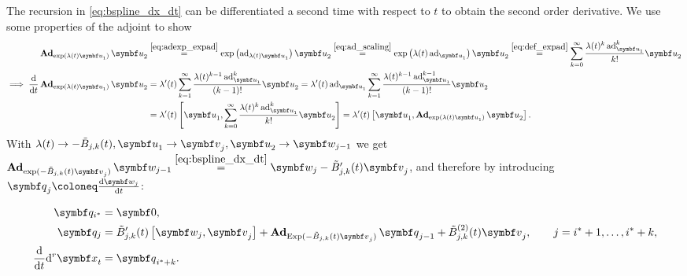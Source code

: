 The recursion in \eqref{eq:bspline_dx_dt} can be differentiated a second time with respect to $t$ to obtain the second order derivative. We use some properties of the adjoint to show
\begin{equation}
  \begin{aligned}
    \bAd_{\exp(\lambda(t) \bu_1)} \bu_2
     & \overset{\eqref{eq:adexp_expad}}= \exp \left( \ad_{\lambda(t) \bu_1} \right) \bu_2 \overset{\eqref{eq:ad_scaling}}= \exp \left( \lambda(t) \ad_{\bu_1} \right) \bu_2 \overset{\eqref{eq:def_expad}}= \sum_{k=0}^\infty \frac{\lambda(t)^k \ad_{\bu_1}^k  }{k!} \bu_2 \\
    \implies \frac{\mathrm{d}}{\mathrm{d}t} \bAd_{\exp(\lambda(t) \bu_1)} \bu_2
     & = \lambda'(t) \sum_{k=1}^\infty \frac{\lambda(t)^{k-1} \ad_{\bu_1}^k }{(k-1)!} \bu_2 = \lambda'(t) \ad_{\bu_1} \sum_{k=1}^\infty \frac{\lambda(t)^{k-1} \ad_{\bu_1}^{k-1} }{(k-1)!}\bu_2                                                                               \\
     & = \lambda'(t) \left[ \bu_1, \sum_{k=0}^\infty \frac{\lambda(t)^k \ad_{\bu_1}^k}{k!} \bu_2 \right]                                                                                   =  \lambda'(t) \left[ \bu_1, \bAd_{\exp(\lambda(t) \bu_1)} \bu_2 \right].
  \end{aligned}
\end{equation}
With $\lambda(t) \rightarrow - \tilde B_{j, k}(t), \bu_1 \rightarrow \bv_j, \bu_2 \rightarrow \symbf w_{j-1}$ we get $\bAd_{\exp(-\tilde B_{j, k}(t) \bv_j)} \symbf w_{j-1} \overset{\eqref{eq:bspline_dx_dt}}= \symbf w_j - \tilde B_{j, k}'(t) \bv_j$, and therefore by introducing $\bq_j \coloneq \frac{\mathrm{d} \symbf w_j}{\mathrm{d} t}$:
\begin{important}
  \begin{equation}
    \begin{aligned}
      \symbf q_{i^*} & = \symbf 0,                                                                                                                                                                        \\
      \symbf q_j     & = \tilde B_{j, k}'(t) \left[ \symbf w_j, \bv_j \right]  + \bAd_{\Exp(-\tilde B_{j, k}(t) \bv_j )} \bq_{j-1} + \tilde B^{(2)}_{j, k}(t) \bv_j, \qquad j = i^* + 1, \ldots, i^* + k, \\
      \frac{\mathrm{d}}{\mathrm{d}t} \mathrm{d}^r \x_t
                     & = \bq_{i^* + k}.
    \end{aligned}
  \end{equation}
\end{important}

